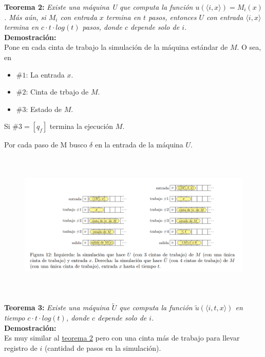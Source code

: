\documentclass{article}
\begin{document}
\begin{flushleft}
  \textbf{\hypertarget{teo2}{Teorema 2:}}
  \textit{Existe una máquina U que computa la función $u(\langle i,x \rangle) = M_i(x)$. Más aún, 
  si $M_i$ con entrada $x$ termina en $t$ pasos, entonces $U$ con entrada $\langle i,x \rangle$ termina
  en $c \cdot t \cdot  log(t)$ pasos, donde $c$ depende solo de $i$.}\\[0.5em]

  \textbf{\textcolor{Mulberry}{Demostración:}} \\[0.5em]

  Pone en cada cinta de trabajo la simulación de la máquina estándar de $M$. O sea, en 
  
  \begin{itemize}
    \item $\#1$: La entrada $x$.
    \item $\#2$: Cinta de trbajo de $M$.
    \item $\#3$: Estado de $M$.
  \end{itemize}

  Si $\#3 = [q_f]$ termina la ejecución $M$.

  Por cada paso de M busco $\delta$ en la entrada de la máquina $U$.

  \begin{figure}[h] 
    \centering 
    \includegraphics[width=17cm, height=7cm]{./imagenes/simulacion_con_maq_universal.png}
  \end{figure}
\end{flushleft}

\begin{flushleft}
  \textbf{Teorema 3:}
  \textit{Existe una máquina $\widetilde{U}$ que computa la función $\widetilde{u}(\langle i,t,x \rangle)$
  en tiempo $c \cdot t \cdot log(t)$, donde $c$ depende solo de $i$.} \\[0.5em]

  \textbf{\textcolor{Mulberry}{Demostración:}} \\[0.5em]

  Es muy similar al \hyperlink{teo2}{\textcolor{Rhodamine}{teorema 2}} pero con una cinta más de trabajo
  para llevar registro de $i$ (cantidad de pasos en la simulación).
\end{flushleft}
\end{document}
